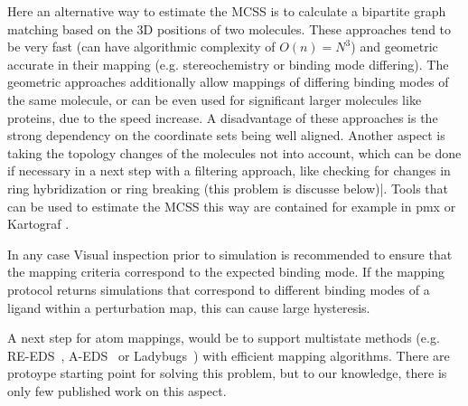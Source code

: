 \documentclass[9pt,bestpractices]{livecoms}
\begin{document}
Here an alternative way to estimate the MCSS is to calculate a bipartite graph matching based on the 3D positions of two molecules. These approaches tend to be very fast (can have algorithmic complexity of $O(n)=N^3$) and geometric accurate in their mapping (e.g. stereochemistry or binding mode differing).
The geometric approaches additionally allow mappings of differing binding modes of the same molecule, or can be even used for significant larger molecules like proteins, due to the speed increase.
A disadvantage of these approaches is the strong dependency on the coordinate sets being well aligned. Another aspect is taking the topology changes of the molecules not into account, which can be done if necessary in a next step with a filtering approach, like checking for changes in ring hybridization or ring breaking (this problem is discusse below)|.
Tools that can be used to estimate the MCSS this way are contained for example in pmx \cite{gapsys2015pmx} or Kartograf \cite{ries2024kartograf}.

In any case Visual inspection prior to simulation is recommended to ensure that the mapping criteria correspond to the expected binding mode. If the mapping protocol returns simulations that correspond to different binding modes of a ligand within a perturbation map, this can cause large hysteresis.

A next step for atom mappings, would be to support multistate methods (e.g. RE-EDS~\cite{sidler2016replica}, A-EDS~\cite{perthold2020toward} or Ladybugs~\cite{robo2022achieving}) with efficient mapping algorithms. There are protoype starting point for solving this problem, but to our knowledge, there is only few published work on this aspect. \cite{petrov2021Perturbation}
\end{document}
